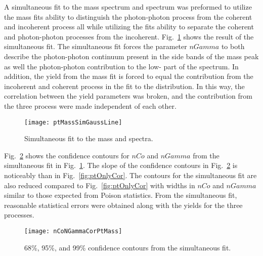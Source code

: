     A simultaneous fit to the mass spectrum and \pt{} 
      spectrum was preformed to utilize the mass fits ability to distinguish 
      the photon-photon process from the coherent and incoherent process all 
      while utilizing the \pt{} fits ability to separate the coherent and 
      photon-photon processes from the incoherent.
    Fig.~\ref{fig:simFitMassPtGauss} shows the result of the simultaneous fit.
    The simultaneous fit forces the parameter $nGamma$ to both describe the 
      photon-photon continuum present in the side bands of the \JPsi{} mass 
      peak as well the photon-photon contribution to the low-\pt{} part of 
      the \pt{} spectrum.
    In addition, the \JPsi{} yield from the mass fit is forced to equal the
      contribution from the incoherent and coherent process in the 
      fit to the \pt{} distribution. 
    In this way, the correlation between the yield parameters was broken, and 
      the contribution from the three process were made independent of each 
      other.
      
    \begin{figure}[!Hhbt]
      \centering
      \texttt{[image: ptMassSimGaussLine]}
      \caption{Simultaneous fit to the mass and \pt{} spectra.}
      \label{fig:simFitMassPtGauss}
    \end{figure}

    Fig.~\ref{fig:simGaussCor} shows the confidence contours for $nCo$ and 
      $nGamma$ from the simultaneous fit in Fig.~\ref{fig:simFitMassPtGauss}.  
    The slope of the confidence contours in Fig.~\ref{fig:simGaussCor} 
      is noticeably than in Fig.~\ref{fig:ptOnlyCor}.
    The contours for the simultaneous fit are also reduced compared to 
      Fig.~\ref{fig:ptOnlyCor} with widths in $nCo$ and $nGamma$ similar to 
      those expected from Poison statistics. 
    From the simultaneous fit, reasonable statistical errors were obtained 
      along with the yields for the three processes. 

    \begin{figure}[!Hhbt]
      \centering
      \texttt{[image: nCoNGammaCorPtMass]}
      \caption{68\%, 95\%, and 99\% confidence contours from the 
        simultaneous fit. }
      \label{fig:simGaussCor}
    \end{figure}


